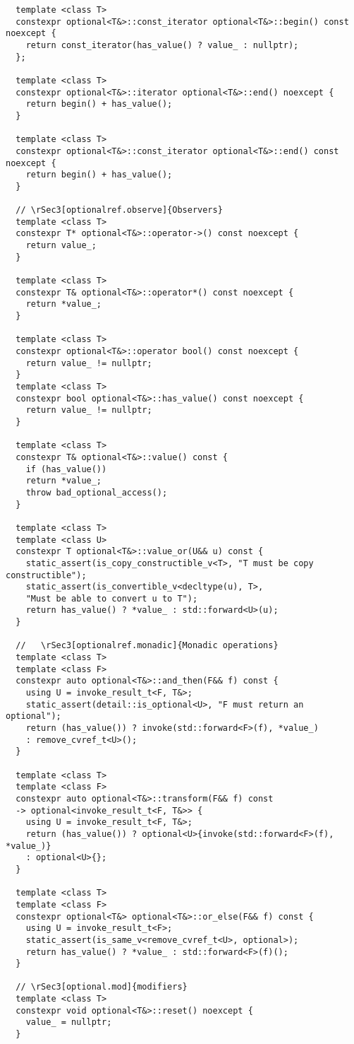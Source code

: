 \documentclass[a4paper,10pt,oneside,openany,final,article]{memoir}
\begin{document}
\begin{verbatim}
  template <class T>
  constexpr optional<T&>::const_iterator optional<T&>::begin() const noexcept {
    return const_iterator(has_value() ? value_ : nullptr);
  };

  template <class T>
  constexpr optional<T&>::iterator optional<T&>::end() noexcept {
    return begin() + has_value();
  }

  template <class T>
  constexpr optional<T&>::const_iterator optional<T&>::end() const noexcept {
    return begin() + has_value();
  }

  // \rSec3[optionalref.observe]{Observers}
  template <class T>
  constexpr T* optional<T&>::operator->() const noexcept {
    return value_;
  }

  template <class T>
  constexpr T& optional<T&>::operator*() const noexcept {
    return *value_;
  }

  template <class T>
  constexpr optional<T&>::operator bool() const noexcept {
    return value_ != nullptr;
  }
  template <class T>
  constexpr bool optional<T&>::has_value() const noexcept {
    return value_ != nullptr;
  }

  template <class T>
  constexpr T& optional<T&>::value() const {
    if (has_value())
    return *value_;
    throw bad_optional_access();
  }

  template <class T>
  template <class U>
  constexpr T optional<T&>::value_or(U&& u) const {
    static_assert(is_copy_constructible_v<T>, "T must be copy constructible");
    static_assert(is_convertible_v<decltype(u), T>,
    "Must be able to convert u to T");
    return has_value() ? *value_ : std::forward<U>(u);
  }

  //   \rSec3[optionalref.monadic]{Monadic operations}
  template <class T>
  template <class F>
  constexpr auto optional<T&>::and_then(F&& f) const {
    using U = invoke_result_t<F, T&>;
    static_assert(detail::is_optional<U>, "F must return an optional");
    return (has_value()) ? invoke(std::forward<F>(f), *value_)
    : remove_cvref_t<U>();
  }

  template <class T>
  template <class F>
  constexpr auto optional<T&>::transform(F&& f) const
  -> optional<invoke_result_t<F, T&>> {
    using U = invoke_result_t<F, T&>;
    return (has_value()) ? optional<U>{invoke(std::forward<F>(f), *value_)}
    : optional<U>{};
  }

  template <class T>
  template <class F>
  constexpr optional<T&> optional<T&>::or_else(F&& f) const {
    using U = invoke_result_t<F>;
    static_assert(is_same_v<remove_cvref_t<U>, optional>);
    return has_value() ? *value_ : std::forward<F>(f)();
  }

  // \rSec3[optional.mod]{modifiers}
  template <class T>
  constexpr void optional<T&>::reset() noexcept {
    value_ = nullptr;
  }

\end{verbatim}
\end{document}
